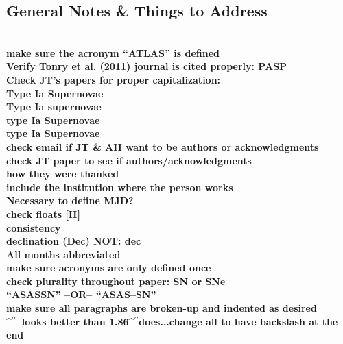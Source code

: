 \documentclass[aps,prb,twocolumn,superscriptaddress]{revtex4-1}
\def\arcsec{\ifmmode^{\prime\prime}\else$^{\prime\prime}$\fi}
\begin{document}
\clearpage
\begin{widetext} %
 \section{General Notes \& Things to Address}
 \\
 {\bf make sure the acronym ``ATLAS'' is defined\\}
 {\bf Verify Tonry et al. (2011) journal is cited properly: PASP\\}
 {\bf Check JT's papers for proper capitalization:\\
 \indent Type Ia Supernovae\\
 \indent Type Ia supernovae\\
 \indent type Ia Supernovae\\
 \indent type Ia Supernovae\\}
 {\bf check email if JT \& AH want to be authors or acknowledgments}\\
 {\bf check JT paper to see if authors/acknowledgments \\
 \indent how they were thanked\\
 \indent include the institution where the person works}\\
 {\bf Necessary to define MJD?}\\
 {\bf check floats [H]}\\
 {\bf \noindent consistency\\
 \indent declination (Dec) NOT: dec\\
 \indent All months abbreviated\\
 \indent make sure acronyms are only defined once\\
 \indent check plurality throughout paper: SN or SNe\\
 \indent ``ASASSN'' --OR-- ``ASAS--SN''\\
 \indent make sure all paragraphs are broken-up and indented as desired\\
 \arcsec\ looks better than 1.86\arcsec does...change all to have backslash at the end\\
 }
\end{widetext}
\end{document}
